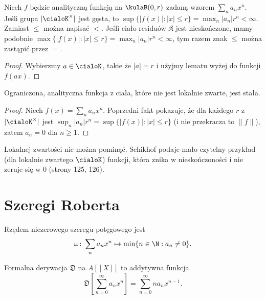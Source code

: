 \begin{fakt}
	Niech $f$ będzie analityczną funkcją na $\kulaB(0, r)$ zadaną wzorem $\sum_n a_n x^n$.
	Jeśli grupa $|\cialoK^\times|$ jest gęsta, to
	$\sup \{|f(x)| : |x| \le r\} = \max_n |a_n| r^n < \infty$.
	Zamiast $\le$ można napisać $<$.
	Jeśli ciało residuów $\mathfrak K$ jest nieskończone, mamy podobnie $\max \{|f(x)| : |x| \le r\} = \max_n |a_n|r^n < \infty$, tym razem znak $\le$ można zastąpić przez $=$.
 \end{fakt}

 \begin{proof}
 	Wybierzmy $a \in \cialoK$, takie że $|a| = r$ i użyjmy lematu wyżej do funkcji $f(ax)$.
 \end{proof}

\begin{twierdzenie}[Liouville]
	Ograniczona, analityczna funkcja z ciała, które nie jest lokalnie zwarte, jest stała.
\end{twierdzenie}

\begin{proof}
	Niech $f(x) = \sum_n a_nx^n$.
	Poprzedni fakt pokazuje, że dla każdego $r$ z $|\cialoK^\times|$ jest $\sup_n |a_n| r^n = \sup\{|f(x)| : |x| \le r\}$ (i nie przekracza to $\|f\|$), zatem $a_n = 0$ dla $n \ge 1$.
\end{proof}

Lokalnej zwartości nie można pominąć.
Schikhof podaje mało czytelny przykład (dla lokalnie zwartego $\cialoK$) funkcji, która znika w nieskończoności i nie zeruje się w $0$ (strony 125, 126).









\section{Szeregi Roberta}










\begin{definicja}
	Rzędem niezerowego szeregu potęgowego jest
	\[
		\omega \colon \sum_n a_n x^n \mapsto \min \{n \in \N: a_n \neq 0\}.
	\]
\end{definicja}

\begin{definicja}
	Formalna derywacja $\mathfrak D$ na $A[[X]]$ to addytywna funkcja
	\[
		\mathfrak D \left[\sum_{n=0}^\infty a_n x^n \right] = \sum_{n=0}^\infty n a_n x^{n-1}.
	\]
\end{definicja}

